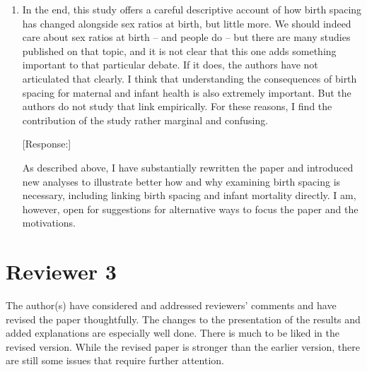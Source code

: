 \documentclass[letterpaper,12pt]{article}
\begin{document}
\begin{enumerate}
[Response:]

As mentioned above, I now include a discussion of the changing spacing's effect on
fertility estimates.
Similarly, although I cannot directly examine the relationship between labor force
participation and spacing because of data limitations, I do discuss the low and 
falling labor force participation in India and the effects this may have on spacing.
I have removed the discussion on contraceptive use (see also my response above).


\item In the end, this study offers a careful descriptive account of how birth
spacing has changed alongside sex ratios at birth, but little more. We
should indeed care about sex ratios at birth – and people do – but there
are many studies published on that topic, and it is not clear that this
one adds something important to that particular debate. If it does, the
authors have not articulated that clearly. I think that understanding
the consequences of birth spacing for maternal and infant health is also
extremely important. But the authors do not study that link empirically.
For these reasons, I find the contribution of the study rather marginal
and confusing.

[Response:]

As described above, I have substantially rewritten the paper and
introduced new analyses to illustrate better how and why examining birth
spacing is necessary, including linking birth spacing and infant
mortality directly. I am, however, open for suggestions for alternative
ways to focus the paper and the motivations.


\end{enumerate}

\newpage

\section*{Reviewer 3}

The author(s) have considered and addressed reviewers’ comments and have
revised the paper thoughtfully. The changes to the presentation of the
results and added explanations are especially well done. There is much
to be liked in the revised version. While the revised paper is stronger
than the earlier version, there are still some issues that require
further attention.
\end{document}

